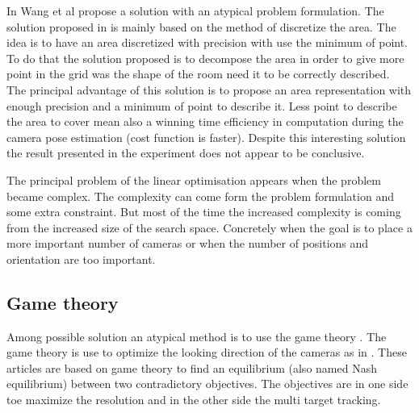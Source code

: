 In Wang et al \cite{181*wang2017} propose a solution with an atypical problem formulation. The solution proposed in \cite{181*wang2017} is mainly based on the method of discretize the area. The idea is to have an area discretized with precision with use the minimum of point. To do that the solution proposed is to decompose the area in order to give more point in the grid was the shape of the room need it to be correctly described. \\
The principal advantage of this solution is to propose an area representation with enough precision and a minimum of point to describe it. Less point to describe the area to cover mean also a winning time efficiency in computation during the camera pose estimation (cost function is faster).
Despite this interesting solution the result presented in the experiment does not appear to be conclusive.  

The principal problem of the linear optimisation appears when the problem became complex. The complexity can come form the  problem formulation and some extra constraint. But most of the time the increased complexity is coming from the increased size of the search space. Concretely when the goal is to place a more important number of cameras or when the number of positions and orientation are too important. 
	
\subsection{Game theory} 
	 
Among possible solution an atypical method is to use the game theory \cite{19*li2013}. The game theory is use to optimize the looking direction of the cameras as in \cite{12*soto2009,18*ding2012,19*li2013,25*song2008}. These articles are based on game theory to find an equilibrium (also named Nash equilibrium) between two contradictory objectives. The objectives are in one side toe maximize the resolution and  in the other side the multi target tracking.\\

